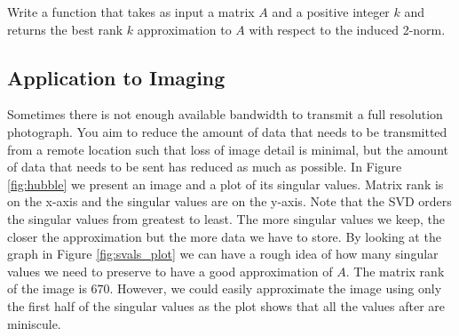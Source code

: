 \begin{problem}
Write a function  that takes as input a matrix $A$ and a positive integer $k$ and returns 
the best rank $k$ approximation to $A$ with respect to the induced 2-norm.
\label{prob:svd_approx}
\end{problem}

\subsection*{Application to Imaging}

Sometimes there is not enough available bandwidth to transmit a full resolution photograph.
You aim to reduce the amount of data that needs to be transmitted from a remote location such that loss of image detail is minimal, but the amount of data that needs to be sent has reduced as much as possible.
In Figure \ref{fig:hubble} we present an image and a plot of its singular values.
Matrix rank is on the x-axis and the singular values are on the y-axis.
Note that the SVD orders the singular values from greatest to least.
The more singular values we keep, the closer the approximation but the more data we have to store.
By looking at the graph in Figure \ref{fig:svals_plot} we can have a rough idea of how many singular values we need to preserve to have a good approximation of $A$.
The matrix rank of the image is $670$.
However, we could easily approximate the image using only the first half of the singular values as the plot shows that all the values after are miniscule.


